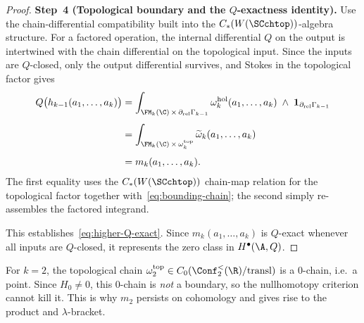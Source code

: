 \begin{proof}
\smallskip
\noindent\textbf{Step~4 (Topological boundary and the $Q$-exactness identity).}
Use the chain-differential compatibility built into the
$C_\ast(W(\SCchtop))$-algebra structure. For a factored operation, the
internal differential $Q$ on the output is intertwined with the chain
differential on the topological input. Since the inputs are $Q$-closed,
only the output differential survives, and Stokes in the topological
factor gives
\begin{align*}
Q\bigl(h_{k-1}(a_1,\ldots,a_k)\bigr)
&=
\int_{\FM_k(\C)\,\times\,\partial_{\mathrm{rel}}\Gamma_{k-1}}
\omega_k^{\mathrm{hol}}(a_1,\ldots,a_k)
\;\wedge\;\mathbf{1}_{\partial_{\mathrm{rel}}\Gamma_{k-1}}
\\[4pt]
&=
\int_{\FM_k(\C)\,\times\,\omega_k^{\mathrm{top}}}
\widetilde\omega_k(a_1,\ldots,a_k)
\\[4pt]
&=
m_k(a_1,\ldots,a_k).
\end{align*}
The first equality uses the $C_\ast(W(\SCchtop))$ chain-map relation for the
topological factor together with~\eqref{eq:bounding-chain}; the second simply
re-assembles the factored integrand.

This establishes~\eqref{eq:higher-Q-exact}. Since $m_k(a_1,\ldots,a_k)$ is
$Q$-exact whenever all inputs are $Q$-closed, it represents the zero class in
$H^\bullet(\A,Q)$.
\end{proof}

\begin{remark}[Why $k=2$ escapes]
\label{rem:why-k2-escapes}
For $k=2$, the topological chain $\omega_2^{\mathrm{top}}\in
C_0(\Conf_2^{<}(\R)/\mathrm{transl})$ is a $0$-chain, i.e.\ a point.
Since $H_0\neq 0$, this $0$-chain is \emph{not} a boundary, so the
nullhomotopy criterion cannot kill it. This is why $m_2$ persists on
cohomology and gives rise to the product and $\lambda$-bracket.
\end{remark}

